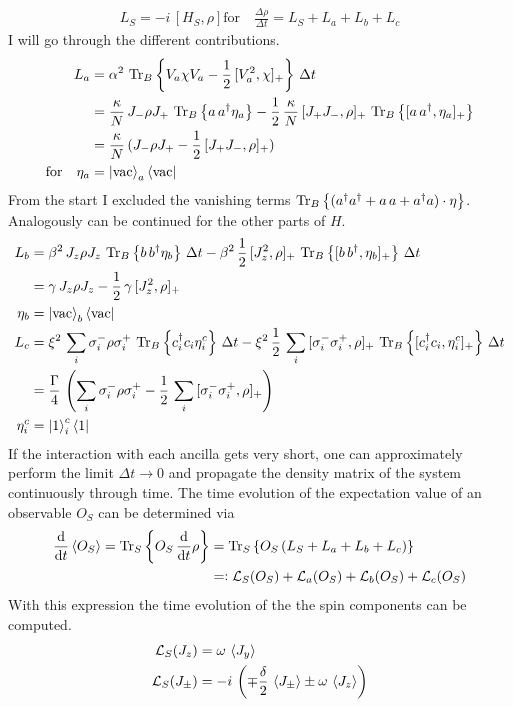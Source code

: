 \documentclass{article}
\begin{document}
\begin{align*}
    L_S=-i\,[H_S,\rho]
    \text{for}\quad \frac{\Delta\rho}{\Delta t}=L_S+L_a+L_b+L_c
\end{align*}
I will go through the different contributions. 
\begin{align*}
    L_a &= \alpha^2\,\operatorname{Tr}_B\left\{V_a\chi V_a-\frac{1}{2}\,[V_a^2,\chi]_+\right\}\,\Delta t\\
    &= \frac{\kappa}{N}\,J_-\rho J_+\,\operatorname{Tr}_B\left\{a\,a^\dagger\eta_a\right\}-\frac{1}{2}\,\frac{\kappa}{N}\,[J_+J_-,\rho]_+\,\operatorname{Tr}_B\left\{[a\,a^\dagger,\eta_a]_+\right\}\\
    &=\frac{\kappa}{N}\,(J_-\rho J_+-\frac{1}{2}\,[J_+J_-,\rho]_+)\\
    \text{for}\quad\eta_a&=\ket{\text{vac}}_a\bra{\text{vac}}
\end{align*}
From the start I excluded the vanishing terms $\operatorname{Tr}_B\left\{(a^\dagger a^\dagger+a\,a+a^\dagger a)\cdot\eta\right\}$. Analogously can be continued for the other parts of $H$.
\begin{align*}
    L_b&= \beta^2\,J_z\rho J_z\, \operatorname{Tr}_B\left\{b\,b^\dagger\eta_b\right\}\,\Delta t-\beta^2\,\frac{1}{2}\,[J_z^2,\rho]_+\,\operatorname{Tr}_B\left\{[b\,b^\dagger,\eta_b]_+\right\}\,\Delta t\\
    &=\gamma\,J_z\rho J_z-\frac{1}{2}\,\gamma\,[J_z^2,\rho]_+\\
    \eta_b&=\ket{\text{vac}}_b\bra{\text{vac}}\\
    L_c&= \xi^2\,\sum_i\sigma_i^-\rho \sigma_i^+\, \operatorname{Tr}_B\left\{c_i^\dagger c_i\eta^c_i\right\}\,\Delta t-\xi^2\,\frac{1}{2}\,\sum_i\,[\sigma_i^-\sigma_i^+,\rho]_+\,\operatorname{Tr}_B\left\{[c_i^\dagger c_i,\eta^c_i]_+\right\}\,\Delta t\\
    &=\frac{\Gamma}{4}\,\left(\sum_i\sigma_i^-\rho \sigma_i^+-\frac{1}{2}\,\sum_i\,[\sigma_i^-\sigma_i^+,\rho]_+\right)\\
    \eta^c_i&=\ket{1}^c_i\bra{1}
\end{align*}
If the interaction with each ancilla gets very short, one can approximately perform the limit $\Delta t\rightarrow0$ and propagate the density matrix of the system continuously through time. The time evolution of the expectation value of an observable $O_S$ can be determined via 
\begin{align*}
    \frac{\text{d}}{\text{d}t} \braket{O_S}=\operatorname{Tr}_S\left\{O_S\,\frac{\text{d}}{\text{d}t}\rho\right\}&=\operatorname{Tr}_S\left\{O_S\,(L_S+L_a+L_b+L_c)\right\}\\
    &=\vcentcolon \mathcal{L}_S(O_S)+\mathcal{L}_a(O_S)+\mathcal{L}_b(O_S)+\mathcal{L}_c(O_S)
\end{align*}
With this expression the time evolution of the the spin components can be computed.
\begin{align*}
    \mathcal{L}_S(J_z)&=\omega\,\braket{J_y}\\
    \mathcal{L}_S(J_\pm)&=-i\,\left(\mp\frac{\delta}{2}\, \braket{J_\pm} \pm \omega\, \braket{J_z}\right)
\end{align*}
\end{document}
